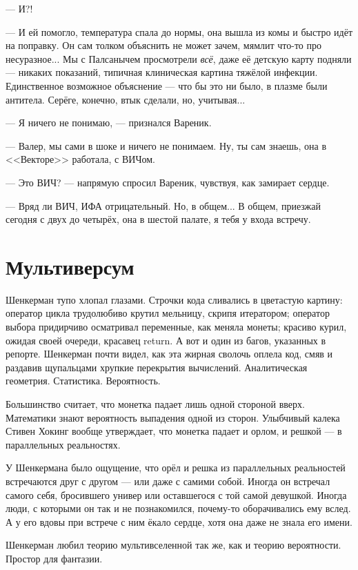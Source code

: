 \documentclass[a4paper,10pt,fleqn]{book}\usepackage{polyglossia}\setdefaultlanguage{english}\setotherlanguage{russian}\defaultfontfeatures{Ligatures=TeX,Mapping=tex-text} \usepackage{xcolor}\definecolor{lightgray}{HTML}{bbbbbb}\color{lightgray}\newcommand{\ml}[3]{\textcolor{black}{#3}}
\begin{document}
--- И?!

--- И ей помогло, температура спала до нормы, она вышла из комы и быстро идёт на поправку.
Он сам толком объяснить не может зачем, мямлит что-то про несуразное...
Мы с Палсанычем просмотрели \emph{всё}, даже её детскую карту подняли --- никаких показаний, типичная клиническая картина тяжёлой инфекции.
Единственное возможное объяснение --- что бы это ни было, в плазме были антитела.
Серёге, конечно, втык сделали, но, учитывая...

--- Я ничего не понимаю, --- признался Вареник.

--- Валер, мы сами в шоке и ничего не понимаем.
Ну, ты сам знаешь, она в <<Векторе>> работала, с ВИЧом.

--- Это ВИЧ? --- напрямую спросил Вареник, чувствуя, как замирает сердце.

--- Вряд ли ВИЧ, ИФА отрицательный.
Но, в общем...
В общем, приезжай сегодня с двух до четырёх, она в шестой палате, я тебя у входа встречу.

\section{Мультиверсум}

Шенкерман тупо хлопал глазами.
Строчки кода сливались в цветастую картину: оператор цикла трудолюбиво крутил мельницу, скрипя итератором;
оператор выбора придирчиво осматривал переменные, как меняла монеты;
красиво курил, ожидая своей очереди, красавец return.
А вот и один из багов, указанных в репорте.
Шенкерман почти видел, как эта жирная сволочь оплела код, смяв и раздавив щупальцами хрупкие перекрытия вычислений.
Аналитическая геометрия.
Статистика.
Вероятность.

Большинство считает, что монетка падает лишь одной стороной вверх.
Математики знают вероятность выпадения одной из сторон.
Улыбчивый калека Стивен Хокинг вообще утверждает, что монетка падает и орлом, и решкой --- в параллельных реальностях.

У Шенкермана было ощущение, что орёл и решка из параллельных реальностей встречаются друг с другом --- или даже с самими собой.
Иногда он встречал самого себя, бросившего универ или оставшегося с той самой девушкой.
Иногда люди, с которыми он так и не познакомился, почему-то оборачивались ему вслед.
А у его вдовы при встрече с ним ёкало сердце, хотя она даже не знала его имени.

Шенкерман любил теорию мультивселенной так же, как и теорию вероятности.
Простор для фантазии.
\end{document}
